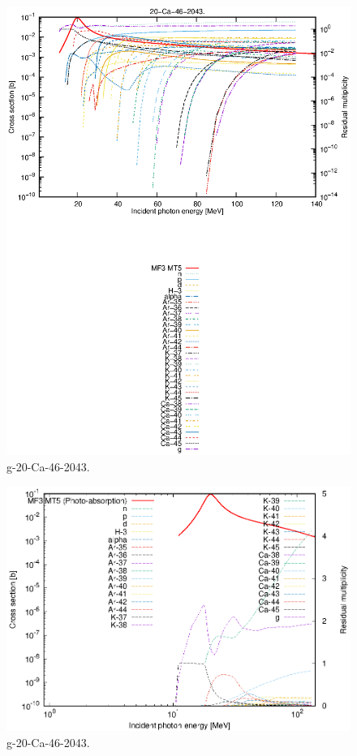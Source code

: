 \begin{figure}
 \includegraphics[width=\linewidth]{eps/g_20-Ca-46_2043.eps}
  \caption{g-20-Ca-46-2043.}
\end{figure}
\newpage \clearpage

\begin{figure}
 \includegraphics[width=\linewidth]{eps-log/g_20-Ca-46_2043.eps}
 \caption{g-20-Ca-46-2043.}
\end{figure}
\newpage \clearpage

